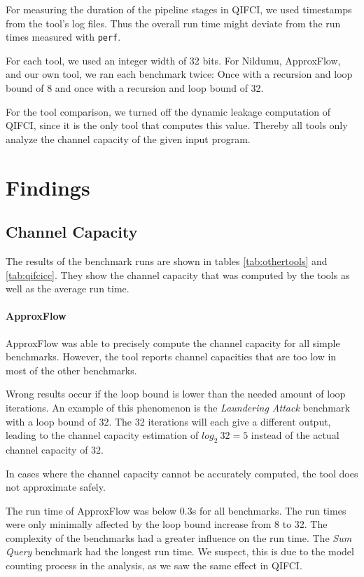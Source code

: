 For measuring the duration of the pipeline stages in QIFCI, we used timestamps from the tool's log files. Thus the overall run time might deviate from the run times measured with \texttt{perf}.

For each tool, we used an integer width of 32 bits. For Nildumu, ApproxFlow, and our own tool, we ran each benchmark twice: Once with a recursion and loop bound of 8 and once with a recursion and loop bound of 32.

For the tool comparison, we turned off the dynamic leakage computation of QIFCI, since it is the only tool that computes this value. Thereby all tools only analyze the channel capacity of the given input program.

\section{Findings}

\subsection{Channel Capacity}
The results of the benchmark runs are shown in tables \ref{tab:othertools} and \ref{tab:qifcicc}. They show the channel capacity that was computed by the tools as well as the average run time.

\paragraph{ApproxFlow}
ApproxFlow was able to precisely compute the channel capacity for all simple benchmarks. However, the tool reports channel capacities that are too low in most of the other benchmarks.

Wrong results occur if the loop bound is lower than the needed amount of loop iterations. An example of this phenomenon is the \emph{Laundering Attack} benchmark with a loop bound of 32. The 32 iterations will each give a different output, leading to the channel capacity estimation of $log_2 \: 32 = 5$ instead of the actual channel capacity of $32$.

In cases where the channel capacity cannot be accurately computed, the tool does not approximate safely.

The run time of ApproxFlow was below 0.3s for all benchmarks. The run times were only minimally affected by the loop bound increase from 8 to 32. The complexity of the benchmarks had a greater influence on the run time. The \emph{Sum Query} benchmark had the longest run time. We suspect, this is due to the model counting process in the analysis, as we saw the same effect in QIFCI.

